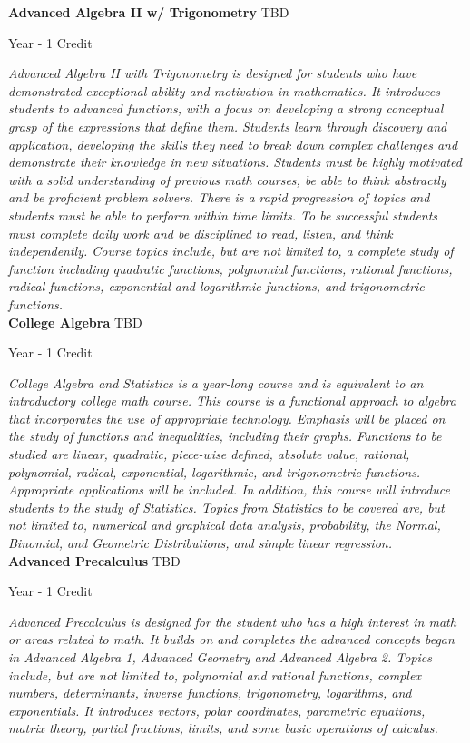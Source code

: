 \noindent\textbf{Advanced Algebra II w/ Trigonometry} \hfill TBD

\noindent Year - 1 Credit

\vspace{1mm}\emph{Advanced Algebra II with Trigonometry is designed for students who have demonstrated exceptional ability and motivation in mathematics. It introduces students to advanced functions, with a focus on developing a strong conceptual grasp of the expressions that define them. Students learn through discovery and application, developing the skills they need to break down complex challenges and demonstrate their knowledge in new situations. Students must be highly motivated with a solid understanding of previous math courses, be able to think abstractly and be proficient problem solvers. There is a rapid progression of topics and students must be able to perform within time limits. To be successful students must complete daily work and be disciplined to read, listen, and think independently. Course topics include, but are not limited to, a complete study of function including quadratic functions, polynomial functions, rational functions, radical functions, exponential and logarithmic functions, and trigonometric functions.}\\


\noindent\textbf{College Algebra} \hfill TBD

\noindent Year - 1 Credit

\vspace{1mm}\emph{College Algebra and Statistics is a year-long course and is equivalent to an introductory college math course. This course is a functional approach to algebra that incorporates the use of appropriate technology. Emphasis will be placed on the study of functions and inequalities, including their graphs. Functions to be studied are linear, quadratic, piece-wise defined, absolute value, rational, polynomial, radical, exponential, logarithmic, and trigonometric functions. Appropriate applications will be included. In addition, this course will introduce students to the study of Statistics. Topics from Statistics to be covered are, but not limited to, numerical and graphical data analysis, probability, the Normal, Binomial, and Geometric Distributions, and simple linear regression.}\\


\noindent\textbf{Advanced Precalculus} \hfill TBD

\noindent Year - 1 Credit

\vspace{1mm}\emph{Advanced Precalculus is designed for the student who has a high interest in math or areas related to math. It builds on and completes the advanced concepts began in Advanced Algebra 1, Advanced Geometry and Advanced Algebra 2. Topics include, but are not limited to, polynomial and rational functions, complex numbers, determinants, inverse functions, trigonometry, logarithms, and exponentials. It introduces vectors, polar coordinates, parametric equations, matrix theory, partial fractions, limits, and some basic operations of calculus. }\\


